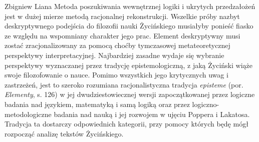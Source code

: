 \begin{artplenv}{Zbigniew Liana}
Metoda poszukiwania wewnętrznej logiki i ukrytych przedzałożeń jest w dużej mierze metodą racjonalnej rekonstrukcji.
Wszelkie próby nazbyt deskryptywnego podejścia do filozofii nauki Życińskiego musiałyby ponieść fiasko ze względu na
wspomniany charakter jego prac. Element deskryptywny musi zostać zracjonalizowany za pomocą choćby tymczasowej
metateoretycznej perspektywy interpretacyjnej. Najbardziej zasadne wydaje się wybranie perspektywy wyznaczanej przez
tradycję epistemologiczną, z jaką Życiński wiąże swoje filozofowanie o nauce. Pomimo wszystkich jego krytycznych uwag i zastrzeżeń,
jest to szeroko rozumiana racjonalistyczna tradycja \textit{episteme} (por. \textit{Elementy}, s. 126) w jej
dwudziestowiecznej wersji zapoczątkowanej przez logiczne badania nad językiem, matematyką i samą logiką oraz przez
logiczno-metodologiczne badania nad nauką i jej rozwojem w ujęciu Poppera i Lakatosa. Tradycja ta dostarczy
odpowiednich kategorii, przy pomocy których będę mógł rozpocząć analizę tekstów Życińskiego. 


\end{artplenv}

